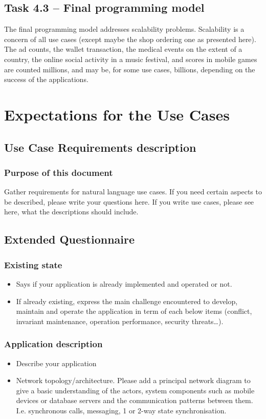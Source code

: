 \documentclass[11pt,a4paper]{report}
\begin{document}
\section{Task 4.3 -- Final programming model}
The final programming model addresses scalability problems. Scalability is a concern of all use cases (except maybe the shop ordering one as presented here). The ad counts, the wallet transaction,  the medical events on the extent of a country, the online social activity in a music festival, and scores in mobile games are counted millions, and may be, for some use cases, billions, depending on the success of the applications. 

\appendix
\chapter{Expectations for the Use Cases}
\section{Use Case Requirements description}
\subsection{Purpose of this document}
Gather requirements for natural language use cases.
If you need certain aspects to be described, please write your questions here.
If you write use cases, please see here, what the descriptions should include.

\section{Extended Questionnaire}

\subsection{Existing state}
\begin{itemize}
\item Says if your application is already implemented and operated or not.
\item If already existing, express the main challenge encountered to develop, maintain and operate the application in term of each below items (conflict, invariant maintenance, operation performance, security threats…).
\end{itemize}

\subsection{Application description}
\begin{itemize}
\item Describe your application
\item Network topology/architecture.
Please add a principal network diagram to give a basic understanding of the actors, system components such as mobile devices or database servers and the communication patterns between them. I.e. synchronous calls, messaging, 1 or 2-way state synchronisation.
\end{itemize}
\end{document}
